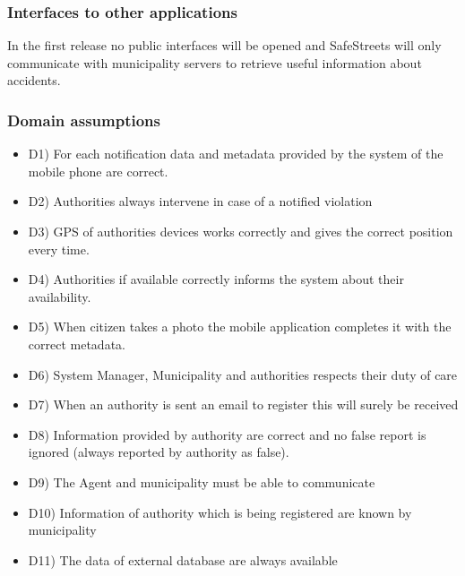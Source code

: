 \subsubsection{ Interfaces to other applications}
In the first release no public interfaces will be opened and SafeStreets will only communicate with municipality servers to retrieve useful information about accidents.
\subsubsection{ Domain assumptions}
\begin{itemize}
\item D1) For each notification data and metadata provided by the system of the mobile phone are correct.
\item D2) Authorities always intervene in case of a notified violation
\item D3) GPS of authorities devices works correctly and gives the correct position every time. 
\item D4) Authorities if available correctly informs the system about their availability. 
\item D5) When citizen takes a photo the mobile application completes it with the correct metadata.
\item D6) System Manager, Municipality and authorities respects their duty of care
\item D7) When an authority is sent an email to register this will surely be received
\item D8) Information provided by authority are correct and no false report is ignored (always reported by authority as false).
\item D9) The Agent and municipality must be able to communicate 
\item D10) Information of authority which is being registered are known by municipality
\item D11) The data of external database are always available
\end{itemize}
